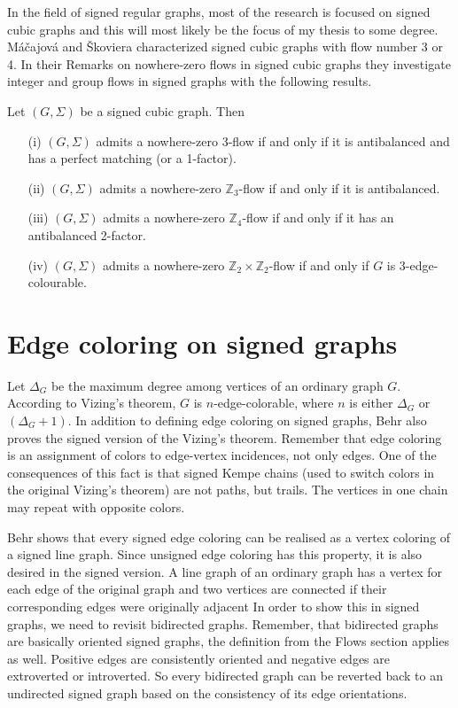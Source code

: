 In the field of signed regular graphs, most of the research is focused on signed cubic graphs and this will most likely be 
the focus of my thesis to some degree. Máčajová and Škoviera
characterized signed cubic graphs with flow number 3 or 4. In their Remarks on nowhere-zero flows in signed cubic graphs\cite{cubic-signed-graphs}
they investigate integer and group flows in signed graphs with the following results.

\begin{theorem}
    Let $(G, \Sigma)$ be a signed cubic graph. Then

    \begin{enumerate}
        \item [(i)] $(G, \Sigma)$ admits a nowhere-zero 3-flow if and only if it is antibalanced and has a perfect matching (or a 1-factor).
        \item [(ii)] $(G, \Sigma)$ admits a nowhere-zero $\mathbb{Z}_3$-flow if and only if it is antibalanced.
        \item [(iii)] $(G, \Sigma)$ admits a nowhere-zero $\mathbb{Z}_4$-flow if and only if it has an antibalanced 2-factor.
        \item [(iv)] $(G, \Sigma)$ admits a nowhere-zero $\mathbb{Z}_2 \times \mathbb{Z}_2$-flow if and only if $G$ is 3-edge-colourable. 
    \end{enumerate}
\end{theorem}

\section{Edge coloring on signed graphs}

Let $\Delta _G$ be the maximum degree among vertices of an ordinary graph $G$. According to Vizing's theorem, $G$ is $n$-edge-colorable, where $n$ is either $\Delta _G$
or $(\Delta _G + 1)$. In addition to defining edge coloring on signed graphs, Behr also proves the signed version of the Vizing's theorem.
Remember that edge coloring is an assignment of colors to edge-vertex incidences, not only edges. One of the consequences of this fact
is that signed Kempe chains (used to switch colors in the original Vizing's theorem) are not paths, but trails. The vertices in one chain may 
repeat with opposite colors. 

Behr shows that every signed edge coloring can be realised as a vertex coloring of a signed line graph.
Since unsigned edge coloring has this property, it is also desired in the signed version. 
A line graph of an ordinary graph has a vertex for each edge of the original graph and two vertices are connected if their corresponding edges were originally adjacent
In order to show this in signed graphs, we need to revisit bidirected graphs. Remember, that bidirected graphs are basically oriented signed graphs, the definition from the Flows section applies as well.
Positive edges are consistently oriented and negative edges are extroverted or introverted.
So every bidirected graph can be reverted back to an undirected signed graph based on the consistency of its edge orientations.

